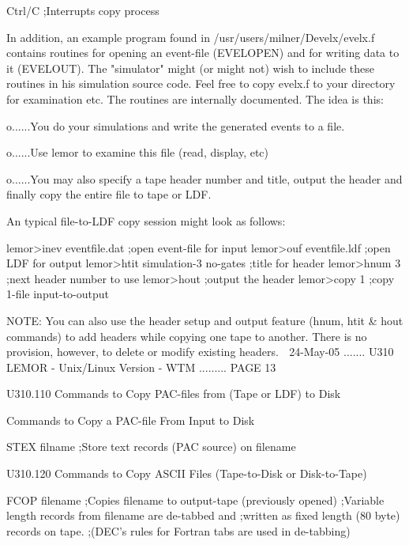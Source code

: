    Ctrl/C        ;Interrupts copy process
 
   In  addition,  an example program found in /usr/users/milner/Develx/evelx.f
   contains routines for opening an  event-file  (EVELOPEN)  and  for  writing
   data  to it (EVELOUT). The "simulator" might (or might not) wish to include
   these routines in his simulation source code. Feel free to copy evelx.f  to
   your directory for examination etc. The routines are internally documented.
   The idea is this:
 
   o......You do your simulations and write the generated events to a file.
 
   o......Use lemor to examine this file (read, display, etc)
 
   o......You  may  also  specify  a  tape header number and title, output the
          header and finally copy the entire file to tape or LDF.
 
   An typical file-to-LDF copy session might look as follows:
 
   lemor>inev  eventfile.dat           ;open event-file for input
   lemor>ouf   eventfile.ldf           ;open LDF for output
   lemor>htit  simulation-3 no-gates   ;title for header
   lemor>hnum  3                       ;next header number to use
   lemor>hout                          ;output the header
   lemor>copy  1                       ;copy 1-file input-to-output
 
   NOTE: You can also use the header setup and output feature  (hnum,  htit  &
   hout  commands)  to add headers while copying one tape to another. There is
   no provision, however, to delete or modify existing headers.
    
   24-May-05 ....... U310  LEMOR - Unix/Linux Version - WTM ......... PAGE  13
 
 
 
   U310.110  Commands to  Copy PAC-files from (Tape or LDF) to Disk
 
 
   Commands to Copy a PAC-file From Input to Disk
 
   STEX filname  ;Store text records (PAC source) on filename
 
 
 
   U310.120  Commands to  Copy ASCII Files (Tape-to-Disk or Disk-to-Tape)
 
   FCOP filename ;Copies filename to output-tape (previously opened)
                 ;Variable length records from filename are de-tabbed and
                 ;written as fixed length (80 byte) records on tape.
                 ;(DEC's rules for Fortran tabs are used in de-tabbing)
 
